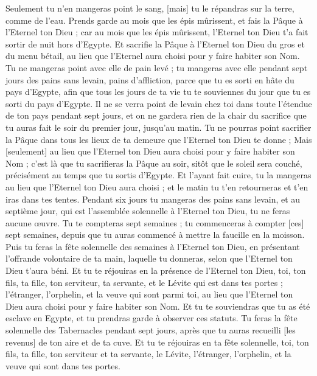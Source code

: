 \begin{multicols}{2}
Seulement tu n'en mangeras point le sang, [mais] tu le répandras sur la terre, comme de l'eau.
\VerseOne{}Prends garde au mois que les épis mûrissent, et fais la Pâque à l'Eternel ton Dieu ; car au mois que les épis mûrissent, l'Eternel ton Dieu t'a fait sortir de nuit hors d'Egypte.
Et sacrifie la Pâque à l'Eternel ton Dieu du gros et du menu bétail, au lieu que l'Eternel aura choisi pour y faire habiter son Nom.
Tu ne mangeras point avec elle de pain levé ; tu mangeras avec elle pendant sept jours des pains sans levain, pains d'affliction, parce que tu es sorti en hâte du pays d'Egypte, afin que tous les jours de ta vie tu te souviennes du jour que tu es sorti du pays d'Egypte.
Il ne se verra point de levain chez toi dans toute l'étendue de ton pays pendant sept jours, et on ne gardera rien de la chair du sacrifice que tu auras fait le soir du premier jour, jusqu'au matin.
Tu ne pourras point sacrifier la Pâque dans tous les lieux de ta demeure que l'Eternel ton Dieu te donne ;
Mais [seulement] au lieu que l'Eternel ton Dieu aura choisi pour y faire habiter son Nom ; c'est là que tu sacrifieras la Pâque au soir, sitôt que le soleil sera couché, précisément au temps que tu sortis d'Egypte.
Et l'ayant fait cuire, tu la mangeras au lieu que l'Eternel ton Dieu aura choisi ; et le matin tu t'en retourneras et t'en iras dans tes tentes.
Pendant six jours tu mangeras des pains sans levain, et au septième jour, qui est l'assemblée solennelle à l'Eternel ton Dieu, tu ne feras aucune œuvre.
Tu te compteras sept semaines ; tu commenceras à compter [ces] sept semaines, depuis que tu auras commencé à mettre la faucille en la moisson.
Puis tu feras la fête solennelle des semaines à l'Eternel ton Dieu, en présentant l'offrande volontaire de ta main, laquelle tu donneras, selon que l'Eternel ton Dieu t'aura béni.
Et tu te réjouiras en la présence de l'Eternel ton Dieu, toi, ton fils, ta fille, ton serviteur, ta servante, et le Lévite qui est dans tes portes ; l'étranger, l'orphelin, et la veuve qui sont parmi toi, au lieu que l'Eternel ton Dieu aura choisi pour y faire habiter son Nom.
Et tu te souviendras que tu as été esclave en Egypte, et tu prendras garde à observer ces statuts.
Tu feras la fête solennelle des Tabernacles pendant sept jours, après que tu auras recueilli [les revenus] de ton aire et de ta cuve.
Et tu te réjouiras en ta fête solennelle, toi, ton fils, ta fille, ton serviteur et ta servante, le Lévite, l'étranger, l'orphelin, et la veuve qui sont dans tes portes.

\end{multicols}
